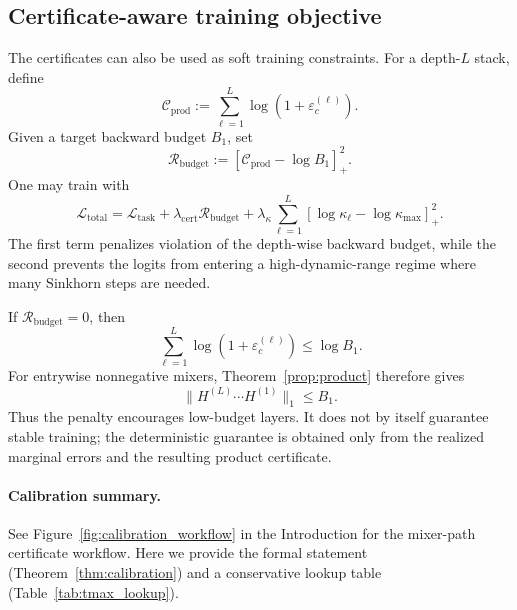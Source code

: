 \documentclass[11pt]{article}
\numberwithin{equation}{section}
\theoremstyle{plain}
\theoremstyle{definition}
\theoremstyle{remark}
\begin{document}
\subsection{Certificate-aware training objective}\label{subsec:certificate_regularizer}
The certificates can also be used as soft training constraints. For a depth-$L$ stack, define
\begin{equation}\label{eq:cert-prod-loss}
        \mathcal C_{\mathrm{prod}}
        :=
        \sum_{\ell=1}^L\log(1+\varepsilon_c^{(\ell)}).
\end{equation}
Given a target backward budget $B_1$, set
\begin{equation}\label{eq:budget-reg}
        \mathcal R_{\mathrm{budget}}
        :=
        \left[\mathcal C_{\mathrm{prod}}-\log B_1\right]_+^2.
\end{equation}
One may train with
\begin{equation}\label{eq:cert-aware-objective}
        \mathcal L_{\mathrm{total}}
        =
        \mathcal L_{\mathrm{task}}
        +\lambda_{\mathrm{cert}}\mathcal R_{\mathrm{budget}}
        +\lambda_\kappa\sum_{\ell=1}^L
        \left[\log\kappa_\ell-\log\kappa_{\max}\right]_+^2.
\end{equation}
The first term penalizes violation of the depth-wise backward budget, while the second prevents the logits from entering a high-dynamic-range regime where many Sinkhorn steps are needed.

If $\mathcal R_{\mathrm{budget}}=0$, then
\[
        \sum_{\ell=1}^L\log(1+\varepsilon_c^{(\ell)})\le\log B_1.
\]
For entrywise nonnegative mixers, Theorem~\ref{prop:product} therefore gives
\begin{equation}\label{eq:zero-cert-penalty-implication}
        \|H^{(L)}\cdots H^{(1)}\|_1\le B_1.
\end{equation}
Thus the penalty encourages low-budget layers.  It does not by itself guarantee
stable training; the deterministic guarantee is obtained only from the realized
marginal errors and the resulting product certificate.


\paragraph{Calibration summary.}
See Figure~\ref{fig:calibration_workflow} in the Introduction for the
mixer-path certificate workflow. Here we provide the formal statement
(Theorem~\ref{thm:calibration}) and a conservative lookup table
(Table~\ref{tab:tmax_lookup}).
\end{document}

